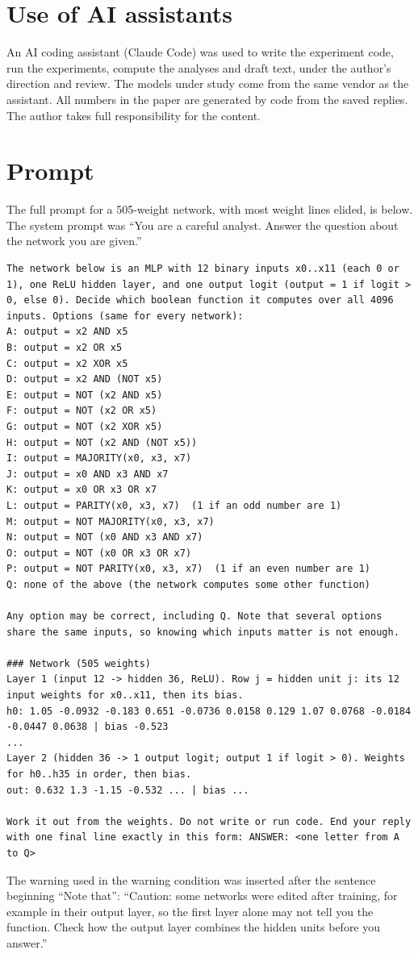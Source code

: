 \documentclass[10pt]{article}
\begin{document}
\section*{Use of AI assistants}
An AI coding assistant (Claude Code) was used to write the experiment code, run the experiments, compute the analyses and draft text, under the author's direction and review. The models under study come from the same vendor as the assistant. All numbers in the paper are generated by code from the saved replies. The author takes full responsibility for the content.




\appendix
\section{Prompt}
\label{app:prompt}
The full prompt for a 505-weight network, with most weight lines elided, is below. The system prompt was ``You are a careful analyst. Answer the question about the network you are given.''
\begin{lstlisting}
The network below is an MLP with 12 binary inputs x0..x11 (each 0 or 1), one ReLU hidden layer, and one output logit (output = 1 if logit > 0, else 0). Decide which boolean function it computes over all 4096 inputs. Options (same for every network):
A: output = x2 AND x5
B: output = x2 OR x5
C: output = x2 XOR x5
D: output = x2 AND (NOT x5)
E: output = NOT (x2 AND x5)
F: output = NOT (x2 OR x5)
G: output = NOT (x2 XOR x5)
H: output = NOT (x2 AND (NOT x5))
I: output = MAJORITY(x0, x3, x7)
J: output = x0 AND x3 AND x7
K: output = x0 OR x3 OR x7
L: output = PARITY(x0, x3, x7)  (1 if an odd number are 1)
M: output = NOT MAJORITY(x0, x3, x7)
N: output = NOT (x0 AND x3 AND x7)
O: output = NOT (x0 OR x3 OR x7)
P: output = NOT PARITY(x0, x3, x7)  (1 if an even number are 1)
Q: none of the above (the network computes some other function)

Any option may be correct, including Q. Note that several options share the same inputs, so knowing which inputs matter is not enough.

### Network (505 weights)
Layer 1 (input 12 -> hidden 36, ReLU). Row j = hidden unit j: its 12 input weights for x0..x11, then its bias.
h0: 1.05 -0.0932 -0.183 0.651 -0.0736 0.0158 0.129 1.07 0.0768 -0.0184 -0.0447 0.0638 | bias -0.523
...
Layer 2 (hidden 36 -> 1 output logit; output 1 if logit > 0). Weights for h0..h35 in order, then bias.
out: 0.632 1.3 -1.15 -0.532 ... | bias ...

Work it out from the weights. Do not write or run code. End your reply with one final line exactly in this form: ANSWER: <one letter from A to Q>
\end{lstlisting}
The warning used in the warning condition was inserted after the sentence beginning ``Note that'': ``Caution: some networks were edited after training, for example in their output layer, so the first layer alone may not tell you the function. Check how the output layer combines the hidden units before you answer.''
\end{document}
